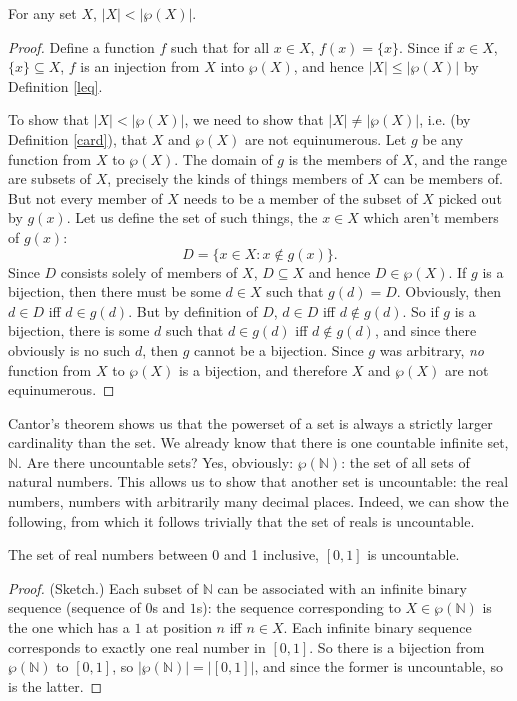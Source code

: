 \begin{theorem}[Cantor]\label{cantor}
For any set $X$, $|X| < |\wp(X)|$.
\begin{proof}
	Define a function $f$ such that for all $x \in X$, $f(x) = \{x\}$. Since if $x \in X$, $\{x\} \subseteq X$, $f$ is an injection from $X$ into $\wp(X)$, and hence $|X|\leq|\wp(X)|$ by Definition \ref{leq}.
	
	To show that $|X| < |\wp(X)|$, we need to show that $|X| \neq |\wp(X)|$, i.e. (by Definition \ref{card}), that $X$ and $\wp({X})$ are not equinumerous. Let $g$ be any function from $X$ to $\wp(X)$. The domain of $g$ is the members of $X$, and the range are subsets of $X$, precisely the kinds of things members of $X$ can be members of. But not every member of $X$ needs to be a member of the subset of $X$ picked out by $g(x)$. Let us define the set of such things, the $x\in X$ which aren't members of $g(x)$: $$D = \{x \in X : x \notin g(x)\}.$$
	    Since $D$ consists solely of members of $X$, $D \subseteq X$ and hence $D \in \wp(X)$. If $g$ is a bijection, then there must be some $d \in X$ such that $g(d) = D$. Obviously, then $d \in D$ iff $d \in g(d)$. But by definition of $D$, $d \in D$ iff $d \notin g(d)$. So if $g$ is a bijection, there is some $d$ such that $d \in g(d)$ iff $d \notin g(d)$, and since there obviously is no such $d$, then $g$ cannot be a bijection. Since $g$ was arbitrary, \emph{no} function from $X$ to $\wp(X)$ is a bijection, and therefore $X$ and $\wp(X)$ are not equinumerous.
  \end{proof}
\end{theorem} 
Cantor's theorem shows us that the powerset of a set is always a strictly larger cardinality than the set. We already know that there is one countable infinite set, $\mathbb{N}$. Are there uncountable sets? Yes, obviously: $\wp(\mathbb{N})$: the set of all sets of natural numbers. This allows us to show that another set is uncountable: the real numbers, numbers with arbitrarily many decimal places. Indeed, we can show the following, from which it follows trivially that the set of reals is uncountable. 
\begin{theorem}[Uncountability of {$[0,1]$}]
The set of real numbers between 0 and 1 inclusive, $[0,1]$ is uncountable. \begin{proof}
	(Sketch.) Each subset of $\mathbb{N}$ can be associated with an infinite binary sequence (sequence of $0$s and $1$s): the sequence corresponding to $X \in \wp(\mathbb{N})$ is the one which has a $1$ at position $n$ iff $n \in X$. Each infinite binary sequence corresponds to exactly one real number in $[0,1]$. So there is a bijection from $\wp(\mathbb{N})$ to $[0,1]$, so $|\wp(\mathbb{N})| = |[0,1]|$, and since the former is uncountable, so is the latter.
\end{proof}
\end{theorem}


